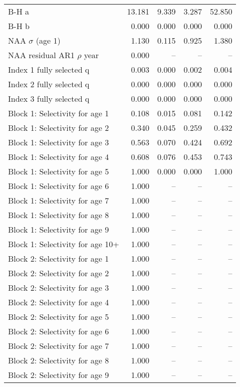 \documentclass[
]{article}
\begin{document}
\begin{landscape}
\begin{longtable}[t]{lrrrr}
\endfoot
\bottomrule
\endlastfoot
B-H a & 13.181 & 9.339 & 3.287 & 52.850\\
B-H b & 0.000 & 0.000 & 0.000 & 0.000\\
NAA $\sigma$ (age 1) & 1.130 & 0.115 & 0.925 & 1.380\\
NAA residual AR1 $\rho$ year & 0.000 & -- & -- & --\\
Index 1 fully selected q & 0.003 & 0.000 & 0.002 & 0.004\\
\addlinespace
Index 2 fully selected q & 0.000 & 0.000 & 0.000 & 0.000\\
Index 3 fully selected q & 0.000 & 0.000 & 0.000 & 0.000\\
Block 1: Selectivity for age 1 & 0.108 & 0.015 & 0.081 & 0.142\\
Block 1: Selectivity for age 2 & 0.340 & 0.045 & 0.259 & 0.432\\
Block 1: Selectivity for age 3 & 0.563 & 0.070 & 0.424 & 0.692\\
\addlinespace
Block 1: Selectivity for age 4 & 0.608 & 0.076 & 0.453 & 0.743\\
Block 1: Selectivity for age 5 & 1.000 & 0.000 & 0.000 & 1.000\\
Block 1: Selectivity for age 6 & 1.000 & -- & -- & --\\
Block 1: Selectivity for age 7 & 1.000 & -- & -- & --\\
Block 1: Selectivity for age 8 & 1.000 & -- & -- & --\\
\addlinespace
Block 1: Selectivity for age 9 & 1.000 & -- & -- & --\\
Block 1: Selectivity for age 10+ & 1.000 & -- & -- & --\\
Block 2: Selectivity for age 1 & 1.000 & -- & -- & --\\
Block 2: Selectivity for age 2 & 1.000 & -- & -- & --\\
Block 2: Selectivity for age 3 & 1.000 & -- & -- & --\\
\addlinespace
Block 2: Selectivity for age 4 & 1.000 & -- & -- & --\\
Block 2: Selectivity for age 5 & 1.000 & -- & -- & --\\
Block 2: Selectivity for age 6 & 1.000 & -- & -- & --\\
Block 2: Selectivity for age 7 & 1.000 & -- & -- & --\\
Block 2: Selectivity for age 8 & 1.000 & -- & -- & --\\
\addlinespace
Block 2: Selectivity for age 9 & 1.000 & -- & -- & --\\

\end{longtable}
\end{landscape}
\end{document}
